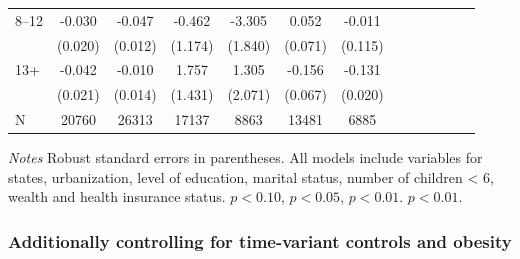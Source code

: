 \documentclass[12pt,english]{article}
\begin{document}
\begin{table}[p]
\begin{center}
\begin{adjustbox}{max width=.9\linewidth}
\begin{threeparttable}
{\begin{tabular}{l*{6}{S S}}
						\hspace*{10mm}8--12 &    -0.030         &   -0.047\sym{***}&   -0.462         &   -3.305\sym{*}  &    0.052         &   -0.011         \\
						&  (0.020)         &  (0.012)         &  (1.174)         &  (1.840)         &  (0.071)         &  (0.115)         \\
						\hspace*{10mm}13+ &   -0.042\sym{**} &   -0.010         &    1.757         &    1.305         &   -0.156\sym{**} &   -0.131\sym{***}\\
						&  (0.021)         &  (0.014)         &  (1.431)         &  (2.071)         &  (0.067)         &  (0.020)         \\
						\midrule
						N               &    20760         &    26313         &    17137         &     8863         &    13481         &     6885         \\
						\bottomrule
					\end{tabular}
					\begin{tablenotes}
					\item \footnotesize \textit{Notes} Robust standard errors in parentheses. All models include variables for  states, urbanization, level of education, marital status, number of children < 6, wealth and health insurance status. \sym{*} \(p<0.10\), \sym{**} \(p<0.05\), \sym{***} \(p<0.01\). \(p<0.01\).
					\end{tablenotes}
				}
			\end{threeparttable}
		\end{adjustbox}
	\end{center}
\end{table}
\clearpage

\subsubsection*{Additionally controlling for time-variant controls and obesity}
\end{document}
